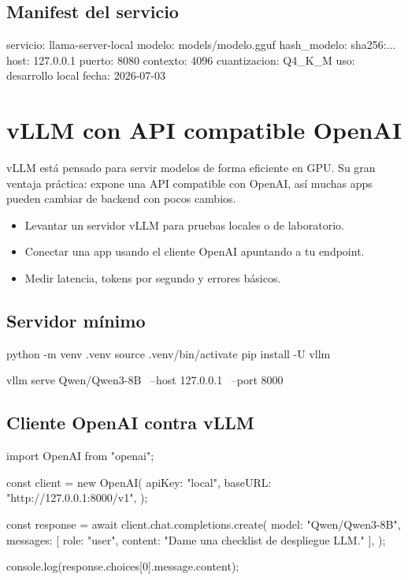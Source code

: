 \documentclass[11pt,a4paper]{book}
\begin{document}
\section{Manifest del servicio}
\begin{codebox}
servicio: llama-server-local
modelo: models/modelo.gguf
hash_modelo: sha256:...
host: 127.0.0.1
puerto: 8080
contexto: 4096
cuantizacion: Q4_K_M
uso: desarrollo local
fecha: 2026-07-03
\end{codebox}
\chapter{vLLM con API compatible OpenAI}
vLLM está pensado para servir modelos de forma eficiente en GPU. Su gran ventaja práctica: expone una API compatible con OpenAI, así muchas apps pueden cambiar de backend con pocos cambios.

\begin{itemize}\item Levantar un servidor vLLM para pruebas locales o de laboratorio.\end{itemize}
\begin{itemize}\item Conectar una app usando el cliente OpenAI apuntando a tu endpoint.\end{itemize}
\begin{itemize}\item Medir latencia, tokens por segundo y errores básicos.\end{itemize}
\section{Servidor mínimo}
\begin{codebox}
python -m venv .venv
source .venv/bin/activate
pip install -U vllm

vllm serve Qwen/Qwen3-8B \
  --host 127.0.0.1 \
  --port 8000
\end{codebox}
\section{Cliente OpenAI contra vLLM}
\begin{codebox}
import OpenAI from "openai";

const client = new OpenAI({
  apiKey: "local",
  baseURL: "http://127.0.0.1:8000/v1",
});

const response = await client.chat.completions.create({
  model: "Qwen/Qwen3-8B",
  messages: [{ role: "user", content: "Dame una checklist de despliegue LLM." }],
});

console.log(response.choices[0].message.content);
\end{codebox}
\end{document}
